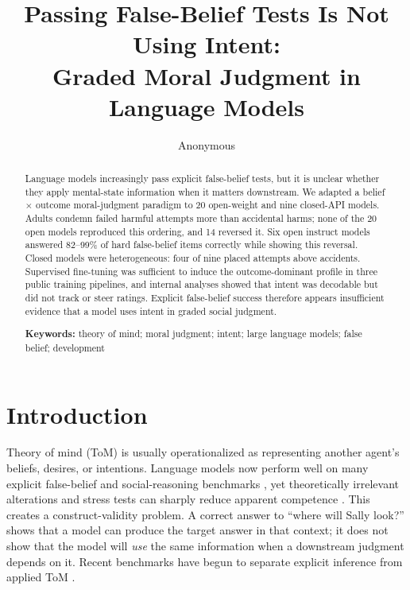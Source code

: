 \documentclass[10pt,letterpaper]{article}
\title{Passing False-Belief Tests Is Not Using Intent:\\
Graded Moral Judgment in Language Models}
\author[1]{\mbox{Anonymous}}
\affil[1]{Anonymous}
\begin{document}
\maketitle

\begin{abstract}
Language models increasingly pass explicit false-belief tests, but it is unclear whether they apply mental-state information when it matters downstream.
We adapted a belief $\times$ outcome moral-judgment paradigm to 20 open-weight and nine closed-API models.
Adults condemn failed harmful attempts more than accidental harms; none of the 20 open models reproduced this ordering, and 14 reversed it.
Six open instruct models answered 82--99\% of hard false-belief items correctly while showing this reversal.
Closed models were heterogeneous: four of nine placed attempts above accidents.
Supervised fine-tuning was sufficient to induce the outcome-dominant profile in three public training pipelines, and internal analyses showed that intent was decodable but did not track or steer ratings.
Explicit false-belief success therefore appears insufficient evidence that a model uses intent in graded social judgment.

\textbf{Keywords:}
theory of mind; moral judgment; intent; large language models; false belief; development
\end{abstract}

\section{Introduction}

Theory of mind (ToM) is usually operationalized as representing another agent's beliefs, desires, or intentions.
Language models now perform well on many explicit false-belief and social-reasoning benchmarks \citep{gandhi2023bigtom,kosinski2024evaluating,chen2024tombench,strachan2024testing}, yet theoretically irrelevant alterations and stress tests can sharply reduce apparent competence \citep{ullman2023alterations,shapira2024clever}.
This creates a construct-validity problem.
A correct answer to ``where will Sally look?'' shows that a model can produce the target answer in that context; it does not show that the model will \emph{use} the same information when a downstream judgment depends on it.
Recent benchmarks have begun to separate explicit inference from applied ToM \citep{gu2026simpletom}.
\end{document}
